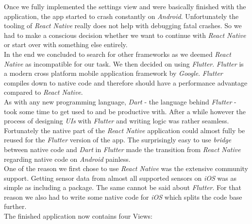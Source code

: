\documentclass{article}
\begin{document}
  Once we fully implemented the settings view and were basically finished with the application, the app started to crash constantly on \textit{Android}. Unfortunately the tooling of \textit{React Native} really does not help with debugging fatal crashes. So we had to make a conscious decision whether we want to continue with \textit{React Native} or start over with something else entirely. \\
  In the end we concluded to search for other frameworks as we deemed \textit{React Native} as incompatible for our task. We then decided on using \textit{Flutter}. \textit{Flutter} is a modern cross platform mobile application framework by \textit{Google}. \textit{Flutter} compiles down to native code and therefore should have a performance advantage compared to \textit{React Native}. \\
  As with any new programming language, \textit{Dart} - the language behind \textit{Flutter} - took some time to get used to and be productive with. After a while however the process of designing \textit{UIs} with \textit{Flutter} and writing logic was rather seamless. Fortunately the native part of the \textit{React Native} application could almost fully be reused for the \textit{Flutter} version of the app. The surprisingly easy to use \textit{bridge} between native code and \textit{Dart} in \textit{Flutter} made the transition from \textit{React Native} regarding native code on \textit{Android} painless. \\
  One of the reason we first chose to use \textit{React Native} was the extensive community support. Getting sensor data from almost all supported sensors on \textit{iOS} was as simple as including a package. The same cannot be said about \textit{Flutter}. For that reason we also had to write some native code for \textit{iOS} which splits the code base further. \\

  The finished application now contains four Views:
\end{document}

